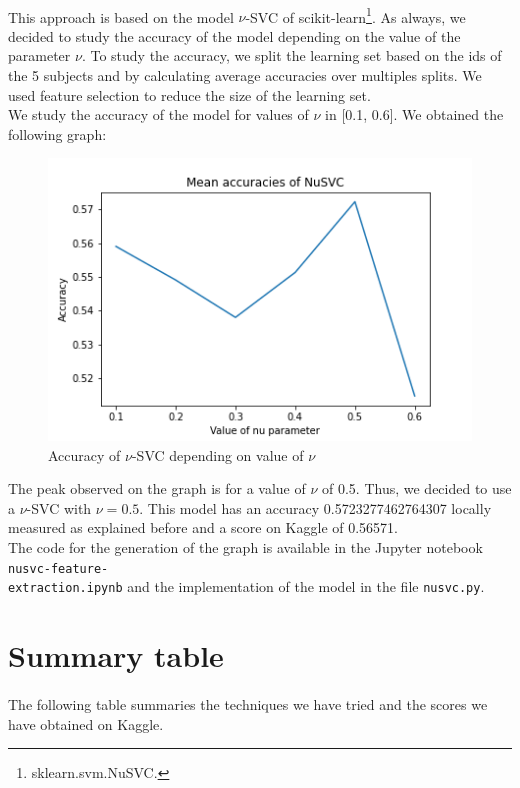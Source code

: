 \documentclass[a4paper, 11pt, oneside]{article}
\begin{document}
\paragraph{}This approach is based on the model $\nu$-SVC of scikit-learn\footnote{sklearn.svm.NuSVC.}. As always, we decided to study the accuracy of the model depending on the value of the parameter $\nu$. To study the accuracy, we split the learning set based on the ids of the 5 subjects and by calculating average accuracies over multiples splits. We used feature selection to reduce the size of the learning set.\\
We study the accuracy of the model for values of $\nu$ in [0.1, 0.6]. We obtained the following graph:
\begin{figure}[H]
\centering
\includegraphics[scale=0.4]{nusvm/svm_nu_svc_accuracies_1.png}
\caption{Accuracy of $\nu$-SVC depending on value of $\nu$}
\end{figure}
The peak observed on the graph is for a value of $\nu$ of 0.5. Thus, we decided to use a $\nu$-SVC with $\nu = 0.5$. This model has an accuracy 0.5723277462764307 locally measured as explained before and a score on Kaggle of 0.56571.\\
The code for the generation of the graph is available in the Jupyter notebook \texttt{nusvc-feature-\\extraction.ipynb} and the implementation of the model in the file \texttt{nusvc.py}.


\section{Summary table} \label{sec:summary}
\paragraph{}The following table summaries the techniques we have tried and the scores we have obtained on Kaggle.
\end{document}
